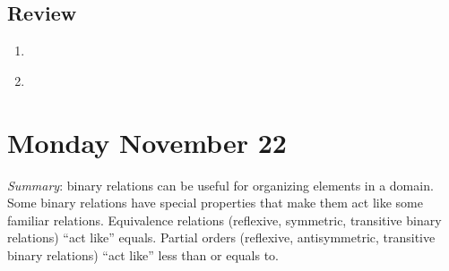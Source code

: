 \documentclass[12pt, oneside]{article}
\begin{document}
\subsection*{Review}
\begin{enumerate}
    \item \hspace{1in}\\ 
    \item \hspace{1in}\\ 
\end{enumerate}

\section*{Monday November 22}




\newpage


\vfill


\vfill


\vfill


\vfill
\newpage

\newpage




\vfill

{\it Summary}: binary relations can be useful for organizing elements in a domain. 
Some binary relations have special properties that make them act like some familiar relations.
Equivalence relations (reflexive, symmetric, transitive binary relations) ``act like'' equals.
Partial orders (reflexive, antisymmetric, transitive binary relations) ``act like'' less than or equals to.
\newpage
\end{document}
